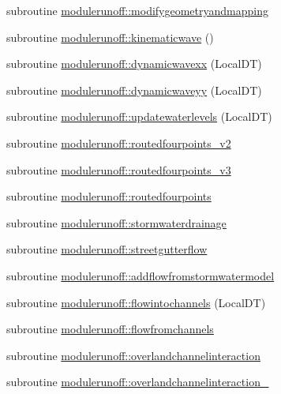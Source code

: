 \begin{DoxyCompactItemize}
\item 
subroutine \mbox{\hyperlink{namespacemodulerunoff_a5ae3563ef43601cbe338d999deca7e2b}{modulerunoff\+::modifygeometryandmapping}}
\item 
subroutine \mbox{\hyperlink{namespacemodulerunoff_ac9ce40d4e0d4a7a1faa6f0a7fd6eca2f}{modulerunoff\+::kinematicwave}} ()
\item 
subroutine \mbox{\hyperlink{namespacemodulerunoff_a18db45ec88a4cf69a97c7b95648bc264}{modulerunoff\+::dynamicwavexx}} (Local\+DT)
\item 
subroutine \mbox{\hyperlink{namespacemodulerunoff_a86d4b0ce5f4e6efc7d53702b40d97604}{modulerunoff\+::dynamicwaveyy}} (Local\+DT)
\item 
subroutine \mbox{\hyperlink{namespacemodulerunoff_ae21623961ce63cf7c148437e7ad9d934}{modulerunoff\+::updatewaterlevels}} (Local\+DT)
\item 
subroutine \mbox{\hyperlink{namespacemodulerunoff_aeedcf3916bc6da030fd004afb251262f}{modulerunoff\+::routedfourpoints\+\_\+v2}}
\item 
subroutine \mbox{\hyperlink{namespacemodulerunoff_a7ca1b43ca23fdb3f25a304ec7ea33a92}{modulerunoff\+::routedfourpoints\+\_\+v3}}
\item 
subroutine \mbox{\hyperlink{namespacemodulerunoff_a0a2296b090b1a35c74f3a4c0e35ad401}{modulerunoff\+::routedfourpoints}}
\item 
subroutine \mbox{\hyperlink{namespacemodulerunoff_af4d68602fac4df4d58a06a8d87433a3b}{modulerunoff\+::stormwaterdrainage}}
\item 
subroutine \mbox{\hyperlink{namespacemodulerunoff_a5cc041140596592ca2cd2f67dfadd9a7}{modulerunoff\+::streetgutterflow}}
\item 
subroutine \mbox{\hyperlink{namespacemodulerunoff_abba7c93964c033b2908d8af2d841a8db}{modulerunoff\+::addflowfromstormwatermodel}}
\item 
subroutine \mbox{\hyperlink{namespacemodulerunoff_a08312a51cf0c25b5c2019c42750e1673}{modulerunoff\+::flowintochannels}} (Local\+DT)
\item 
subroutine \mbox{\hyperlink{namespacemodulerunoff_ad9add85fb1e5efe5eb239bb72e597945}{modulerunoff\+::flowfromchannels}}
\item 
subroutine \mbox{\hyperlink{namespacemodulerunoff_a5181922fc72d5c17acb9fdf3127d6318}{modulerunoff\+::overlandchannelinteraction}}
\item 
subroutine \mbox{\hyperlink{namespacemodulerunoff_a83d1f0b3f63668b07444f05e9e5bcf7c}{modulerunoff\+::overlandchannelinteraction\+\_}}

\end{DoxyCompactItemize}
